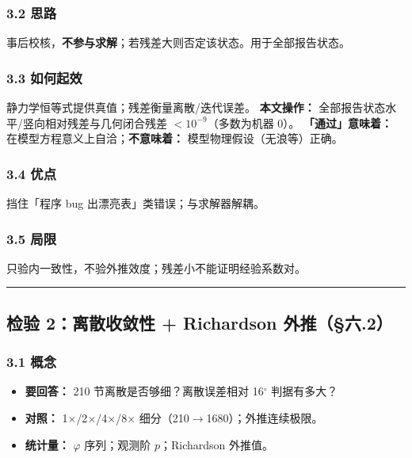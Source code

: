 \documentclass[UTF8,a4paper,zihao=-4]{ctexart}
\begin{document}
\subsubsection{\texorpdfstring{3.2 思路}{3.2 思路}}
事后校核，\textbf{不参与求解}；若残差大则否定该状态。用于全部报告状态。

\subsubsection{\texorpdfstring{3.3 如何起效}{3.3 如何起效}}
静力学恒等式提供真值；残差衡量离散/迭代误差。  
\textbf{本文操作：} 全部报告状态水平/竖向相对残差与几何闭合残差 \(<10^{-9}\)（多数为机器 0）。  
\textbf{「通过」意味着：} 在模型方程意义上自洽；\textbf{不意味着：} 模型物理假设（无浪等）正确。

\subsubsection{\texorpdfstring{3.4 优点}{3.4 优点}}
挡住「程序 bug 出漂亮表」类错误；与求解器解耦。

\subsubsection{\texorpdfstring{3.5 局限}{3.5 局限}}
只验内一致性，不验外推效度；残差小不能证明经验系数对。

\vspace{0.4em}\hrule\vspace{0.4em}

\subsection{\texorpdfstring{检验 2：离散收敛性 + Richardson 外推（§六.2）}{检验 2：离散收敛性 + Richardson 外推（§六.2）}}

\subsubsection{\texorpdfstring{3.1 概念}{3.1 概念}}
\begin{itemize}[leftmargin=1.5em]
\item \textbf{要回答：} 210 节离散是否够细？离散误差相对 16$^\circ$ 判据有多大？
\item \textbf{对照：} 1$\times$/2$\times$/4$\times$/8$\times$ 细分（210$\rightarrow$1680）；外推连续极限。
\item \textbf{统计量：} \(\varphi\) 序列；观测阶 \(p\)；Richardson 外推值。
\end{itemize}
\end{document}
